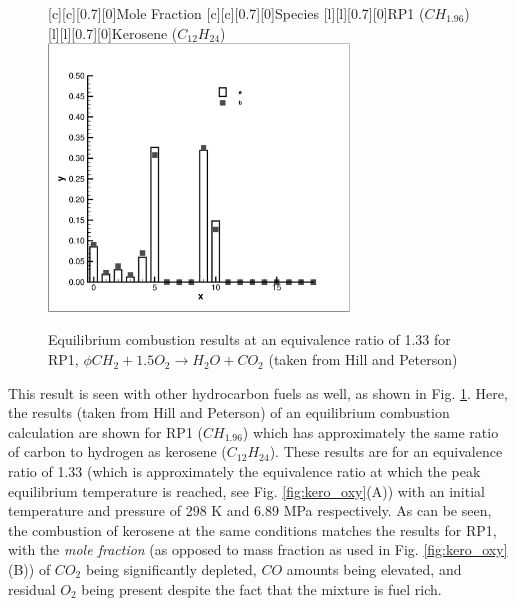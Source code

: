 \begin{figure}[!hb]
\begin{center}
[c][c][0.7][0]{Mole Fraction}
[c][c][0.7][0]{Species}
[l][l][0.7][0]{RP1 ($CH_{1.96}$)}
[l][l][0.7][0]{Kerosene ($C_{12}H_{24}$)}
\includegraphics[width=8cm]{kero_oxycomprp1.eps}
\caption{Equilibrium combustion results at an equivalence ratio of 1.33 for RP1, $\phi CH_2 + 1.5O_2 \to
H_2O + CO_2$
(taken from Hill and Peterson)}
\label{fig:rp1comp}
\end{center}
\end{figure}

	This result is seen with
other hydrocarbon fuels as well, as shown in Fig. \ref{fig:rp1comp}.  Here, the results (taken from
Hill and Peterson) of an equilibrium combustion calculation are shown for RP1 ($CH_{1.96}$) which
has approximately the same ratio of carbon to hydrogen as kerosene ($C_{12}H_{24}$).  These
results are for an equivalence ratio of 1.33 (which is approximately the equivalence ratio at which the 
peak equilibrium temperature is reached, see Fig. \ref{fig:kero_oxy}(A)) with an initial temperature 
and pressure of 298 K and 6.89 MPa respectively.  As can be seen, the combustion of kerosene at the same 
conditions matches the results for RP1, with the \emph{mole fraction} (as opposed to mass fraction as 
used in Fig. \ref{fig:kero_oxy} (B)) of $CO_2$ being significantly depleted, $CO$ amounts being elevated, and
residual $O_2$ being present despite the fact that the mixture is fuel rich.

